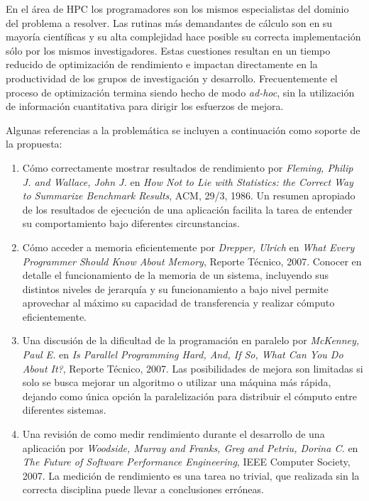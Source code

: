 \documentclass[a4paper]{article}
\begin{document}
En el área de HPC los programadores son los mismos especialistas del dominio del problema a resolver. Las rutinas más demandantes de cálculo son en su mayoría científicas y su alta complejidad hace posible su correcta implementación sólo por los mismos investigadores. Estas cuestiones resultan en un tiempo reducido de optimización de rendimiento e impactan directamente en la productividad de los grupos de investigación y desarrollo. Frecuentemente el proceso de optimización termina siendo hecho de modo {\it ad-hoc}, sin la utilización de información cuantitativa para dirigir los esfuerzos de mejora.

\bigskip

Algunas referencias a la problemática se incluyen a continuación como soporte de la propuesta:

\begin{enumerate}

\item Cómo correctamente mostrar resultados de rendimiento por {\it Fleming, Philip J. and Wallace, John J.} en {\it How Not to Lie with Statistics: the Correct Way to Summarize Benchmark Results}, {ACM}, {29/3}, {1986}. Un resumen apropiado de los resultados de ejecución de una aplicación facilita la tarea de entender su comportamiento bajo diferentes circunstancias.

\bigskip

\item Cómo acceder a memoria eficientemente por {\it Drepper, Ulrich} en {\it What Every Programmer Should Know About Memory}, Reporte Técnico, 2007. Conocer en detalle el funcionamiento de la memoria de un sistema, incluyendo sus distintos niveles de jerarquía y su funcionamiento a bajo nivel permite aprovechar al máximo su capacidad de transferencia y realizar cómputo eficientemente.

\bigskip

\item Una discusión de la dificultad de la programación en paralelo por {\it McKenney, Paul E.} en {\it Is Parallel Programming Hard, And, If So, What Can You Do About It?}, Reporte Técnico, 2007. Las posibilidades de mejora son limitadas si solo se busca mejorar un algoritmo o utilizar una máquina más rápida, dejando como única opción la paralelización para distribuir el cómputo entre diferentes sistemas.

\bigskip

\item Una revisión de como medir rendimiento durante el desarrollo de una aplicación por {\it Woodside, Murray and Franks, Greg and Petriu, Dorina C.} en {\it The Future of Software Performance Engineering}, IEEE Computer Society, 2007. La medición de rendimiento es una tarea no trivial, que realizada sin la correcta disciplina puede llevar a conclusiones erróneas.


\end{enumerate}
\end{document}
